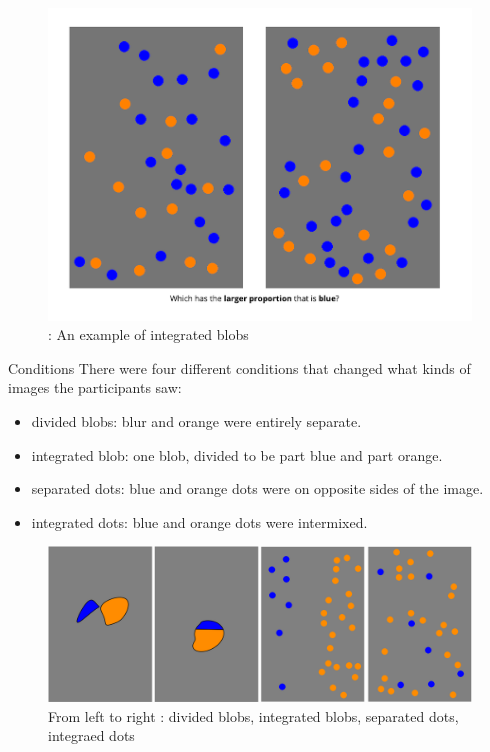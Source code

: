 \documentclass[
  man,floatsintext]{apa6}
\providecommand{\tightlist}{%
  \setlength{\itemsep}{0pt}\setlength{\parskip}{0pt}}
\begin{document}
\begin{figure}

{\centering \includegraphics[width=1\linewidth]{img11/Probtask_Trial} 

}

\caption{ : An example of integrated blobs}\label{fig:img1}
\end{figure}

Conditions There were four different conditions that changed what kinds of images the participants saw:

\begin{itemize}
\tightlist
\item
  divided blobs: blur and orange were entirely separate.
\item
  integrated blob: one blob, divided to be part blue and part orange.
\item
  separated dots: blue and orange dots were on opposite sides of the image.
\item
  integrated dots: blue and orange dots were intermixed.
\end{itemize}

\begin{figure}

{\centering \includegraphics[width=1\linewidth]{img11/Probtask_formats} 

}

\caption{ From left to right : divided blobs, integrated blobs, separated dots, integraed dots}\label{fig:img2}
\end{figure}
\end{document}
